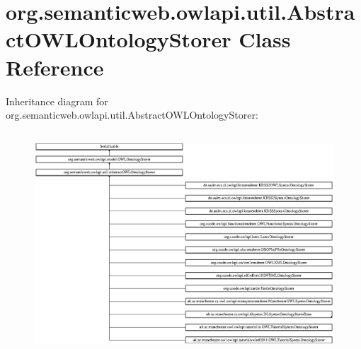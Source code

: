 \hypertarget{classorg_1_1semanticweb_1_1owlapi_1_1util_1_1_abstract_o_w_l_ontology_storer}{\section{org.\-semanticweb.\-owlapi.\-util.\-Abstract\-O\-W\-L\-Ontology\-Storer Class Reference}
\label{classorg_1_1semanticweb_1_1owlapi_1_1util_1_1_abstract_o_w_l_ontology_storer}
}
Inheritance diagram for org.\-semanticweb.\-owlapi.\-util.\-Abstract\-O\-W\-L\-Ontology\-Storer\-:\begin{figure}[H]
\begin{center}
\leavevmode
\includegraphics[height=8.358209cm]{classorg_1_1semanticweb_1_1owlapi_1_1util_1_1_abstract_o_w_l_ontology_storer}
\end{center}
\end{figure}
